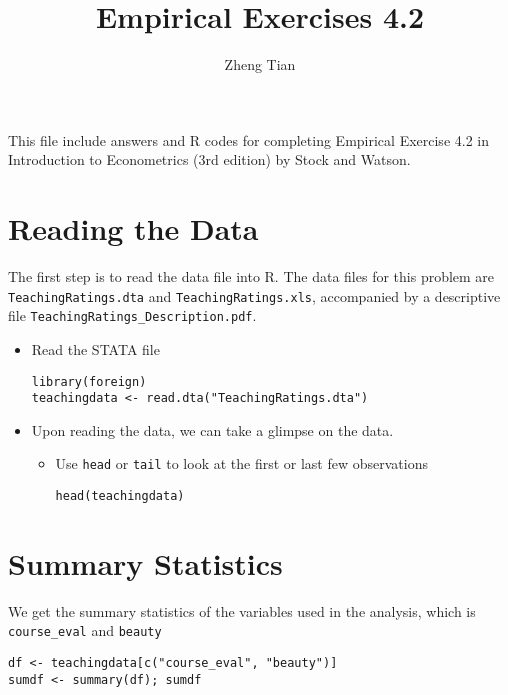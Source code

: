 \documentclass[a4paper,11pt]{article}
\author{Zheng Tian}
\date{}
\title{Empirical Exercises 4.2}
\begin{document}
\maketitle
\setcounter{tocdepth}{1}
\tableofcontents

This file include answers and R codes for completing Empirical
Exercise 4.2 in Introduction to Econometrics (3rd edition) by Stock
and Watson.

\section{Reading the Data}
\label{sec:orgc901ce5}

The first step is to read the data file into R. The data files for
this problem are \texttt{TeachingRatings.dta} and \texttt{TeachingRatings.xls},
accompanied by a descriptive file \texttt{TeachingRatings\_Description.pdf}.

\begin{itemize}
\item Read the STATA file

\begin{verbatim}
library(foreign)
teachingdata <- read.dta("TeachingRatings.dta")
\end{verbatim}

\item Upon reading the data, we can take a glimpse on the data.

\begin{itemize}
\item Use \texttt{head} or \texttt{tail} to look at the first or last few observations

\begin{verbatim}
head(teachingdata)
\end{verbatim}
\end{itemize}
\end{itemize}


\section{Summary Statistics}
\label{sec:org085162a}

We get the summary statistics of the variables used in the analysis,
which is \texttt{course\_eval} and \texttt{beauty}

\begin{verbatim}
df <- teachingdata[c("course_eval", "beauty")]
sumdf <- summary(df); sumdf
\end{verbatim}
\end{document}
